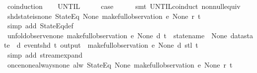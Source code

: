 \begin{isabellebody}
%
\isadelimproof
%
\endisadelimproof
%
\isatagproof
{}\isamarkupfalse%
\ {\isacharparenleft}coinduction{\isacharparenright}\isanewline
\ \ \isamarkupfalse%
\ UNTIL\isanewline
\ \ \isamarkupfalse%
\ \isamarkupfalse%
\ {\isacharquery}case\isanewline
\ \ \ \ \isamarkupfalse%
\ {\isacharparenleft}smt\ UNTIL{\isachardot}coinduct\ non{\isacharunderscore}null{\isacharunderscore}equiv{\isacharparenright}\isanewline
{}\isamarkupfalse%
%
\endisatagproof
{\isafoldproof}%
%
\isadelimproof
\isanewline
%
\endisadelimproof
\isanewline
{}\isamarkupfalse%
\ shd{\isacharunderscore}state{\isacharunderscore}is{\isacharunderscore}none{\isacharcolon}\ {\isachardoublequoteopen}{\isacharparenleft}StateEq\ None{\isacharparenright}\ {\isacharparenleft}make{\isacharunderscore}full{\isacharunderscore}observation\ e\ None\ r\ t{\isacharparenright}{\isachardoublequoteclose}\isanewline
%
\isadelimproof
\ \ %
\endisadelimproof
%
\isatagproof
{}\isamarkupfalse%
\ {\isacharparenleft}simp\ add{\isacharcolon}\ StateEq{\isacharunderscore}def{\isacharparenright}%
\endisatagproof
{\isafoldproof}%
%
\isadelimproof
\isanewline
%
\endisadelimproof
\isanewline
{}\isamarkupfalse%
\ unfold{\isacharunderscore}observe{\isacharunderscore}none{\isacharcolon}\ {\isachardoublequoteopen}make{\isacharunderscore}full{\isacharunderscore}observation\ e\ None\ d\ t\ {\isacharequal}\ {\isacharparenleft}{\isasymlparr}statename\ {\isacharequal}\ None{\isacharcomma}\ datastate\ {\isacharequal}\ d{\isacharcomma}\ event{\isacharequal}{\isacharparenleft}shd\ t{\isacharparenright}{\isacharcomma}\ output\ {\isacharequal}\ {\isacharbrackleft}{\isacharbrackright}{\isasymrparr}{\isacharhash}{\isacharhash}{\isacharparenleft}make{\isacharunderscore}full{\isacharunderscore}observation\ e\ None\ d\ {\isacharparenleft}stl\ t{\isacharparenright}{\isacharparenright}{\isacharparenright}{\isachardoublequoteclose}\isanewline
%
\isadelimproof
\ \ %
\endisadelimproof
%
\isatagproof
{}\isamarkupfalse%
\ {\isacharparenleft}simp\ add{\isacharcolon}\ stream{\isachardot}expand{\isacharparenright}%
\endisatagproof
{\isafoldproof}%
%
\isadelimproof
\isanewline
%
\endisadelimproof
\isanewline
{}\isamarkupfalse%
\ once{\isacharunderscore}none{\isacharunderscore}always{\isacharunderscore}none{\isacharcolon}\ {\isachardoublequoteopen}alw\ {\isacharparenleft}StateEq\ None{\isacharparenright}\ {\isacharparenleft}make{\isacharunderscore}full{\isacharunderscore}observation\ e\ None\ r\ t{\isacharparenright}{\isachardoublequoteclose}\isanewline

\end{isabellebody}
